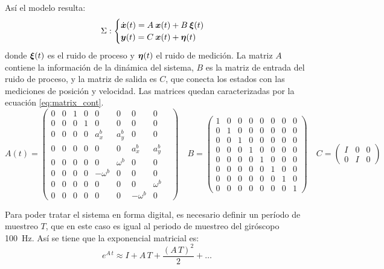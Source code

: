 	Así el modelo resulta:
		\begin{equation*}
			\Sigma:
			\begin{cases}
				\dot{\boldsymbol{x}}(t) = A\: \boldsymbol{x}(t) + B \: \boldsymbol{\xi}(t) \\
				\boldsymbol{y}(t) = C\: \boldsymbol{x}(t) + \boldsymbol{\eta}(t)
			\end{cases}
		\end{equation*}
	donde $\boldsymbol{\xi}(t)$ es el ruido de proceso y $\boldsymbol{\eta}(t)$ el ruido de medición. La matriz $A$ contiene la información de la dinámica del sistema, $B$ es la matriz de entrada del ruido de proceso, y la matriz de salida es $C$, que conecta los estados con las mediciones de posición y velocidad. Las matrices quedan caracterizadas por la ecuación \eqref{eq:matrix_cont}.
		\begin{equation}
			\label{eq:matrix_cont}
			A(t) = \begin{pmatrix}0&0&1&0&0&0&0&0\\[0.3em]0&0&0&1&0&0&0&0\\[0.3em]0&0&0&0&a^b_x&a^b_y&0&0\\[0.3em]0&0&0&0&0&0&a^b_x&a^b_y&\\[0.3em]0&0&0&0&0&\omega^b&0&0\\[0.3em]0&0&0&0&-\omega^b&0&0&0\\[0.3em]0&0&0&0&0&0&0&\omega^b\\[0.3em]0&0&0&0&0&0&-\omega^b&0\end{pmatrix} \quad%
		B = \begin{pmatrix}1&0&0&0&0&0&0&0\\[0.3em]0&1&0&0&0&0&0&0\\[0.3em]0&0&1&0&0&0&0&0\\[0.3em]0&0&0&1&0&0&0&0\\[0.3em]0&0&0&0&1&0&0&0\\[0.3em]0&0&0&0&0&1&0&0\\[0.3em]0&0&0&0&0&0&1&0\\[0.3em]0&0&0&0&0&0&0&1\end{pmatrix} \quad%
			C = \begin{pmatrix}I&0&0\\[0.3em]0&I&0\end{pmatrix}
		\end{equation}
	
	Para poder tratar el sistema en forma digital, es necesario definir un período de muestreo $T$, que en este caso es igual al periodo de muestreo del giróscopo \SI{100}{\Hz}. Así se tiene que la exponencial matricial es:
		\begin{equation*}
			e^{A\,t} \approx I + A\,T + \frac{(A\,T)^2}{2} + \hdots
		\end{equation*}

